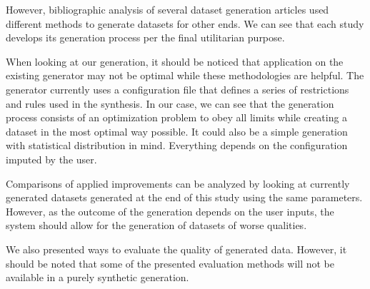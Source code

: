 However, bibliographic analysis of several dataset generation articles used different methods to generate datasets for other ends. We can see that each study develops its generation process per the final utilitarian purpose.

When looking at our generation, it should be noticed that application on the existing generator may not be optimal while these methodologies are helpful. The generator currently uses a configuration file that defines a series of restrictions and rules used in the synthesis. In our case, we can see that the generation process consists of an optimization problem to obey all limits while creating a dataset in the most optimal way possible. It could also be a simple generation with statistical distribution in mind. Everything depends on the configuration imputed by the user. 

Comparisons of applied improvements can be analyzed by looking at currently generated datasets generated at the end of this study using the same parameters. However, as the outcome of the generation depends on the user inputs, the system should allow for the generation of datasets of worse qualities.

We also presented ways to evaluate the quality of generated data. However, it should be noted that some of the presented evaluation methods will not be available in a purely synthetic generation.